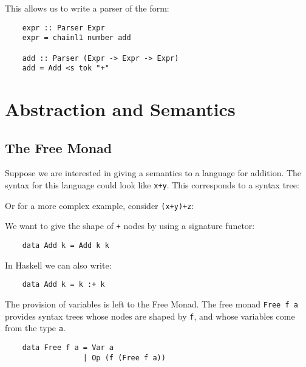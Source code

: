\documentclass[a4paper,12pt]{article}
\theoremstyle{remark}
\begin{document}
This allows us to write a parser of the form:

\begin{lstlisting}
    expr :: Parser Expr
    expr = chainl1 number add

    add :: Parser (Expr -> Expr -> Expr)
    add = Add <s tok "+"  \end{lstlisting}

\section{Abstraction and Semantics}

\subsection{The Free Monad}

Suppose we are interested in giving a semantics to a language for addition. The
syntax for this language could look like \lstinline{x+y}. This corresponds
to a syntax tree:

\begin{figure}[H]
  \centering
\end{figure}

Or for a more complex example, consider \lstinline{(x+y)+z}:

\begin{figure}[H]
  \centering
\end{figure}

We want to give the shape of \lstinline{+} nodes by using a signature functor:

\begin{lstlisting}
    data Add k = Add k k  \end{lstlisting}

In Haskell we can also write:

\begin{lstlisting}
    data Add k = k :+ k  \end{lstlisting}

The provision of variables is left to the Free Monad. The free monad \lstinline{Free f a} provides syntax
trees whose nodes are shaped by \lstinline{f}, and whose variables come from the type \lstinline{a}.

\begin{lstlisting}
    data Free f a = Var a
                  | Op (f (Free f a))  \end{lstlisting}
\end{document}
